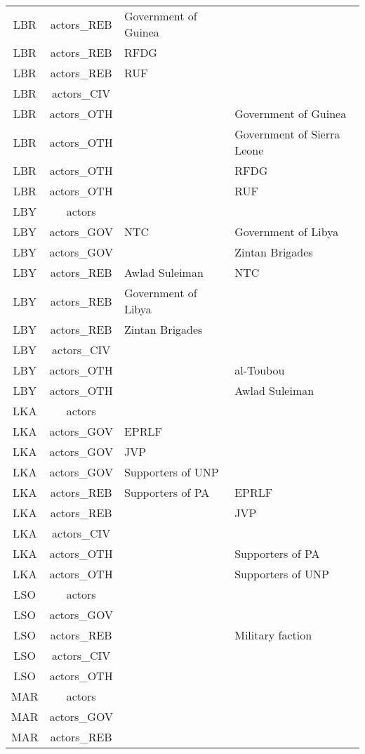 \documentclass[12pt]{article}
\begin{document}
\begin{center}
\begin{longtable}{|c|c|p{7cm}|p{7cm}|}
  LBR & actors\_REB & Government of Guinea &  \\ 
  LBR & actors\_REB & RFDG &  \\ 
  LBR & actors\_REB & RUF &  \\ 
  LBR & actors\_CIV &  &  \\ 
  LBR & actors\_OTH &  & Government of Guinea \\ 
  LBR & actors\_OTH &  & Government of Sierra Leone \\ 
  LBR & actors\_OTH &  & RFDG \\ 
  LBR & actors\_OTH &  & RUF \\ 
  LBY & actors &  &  \\ 
  LBY & actors\_GOV & NTC & Government of Libya \\ 
  LBY & actors\_GOV &  & Zintan Brigades \\ 
  LBY & actors\_REB & Awlad Suleiman & NTC \\ 
  LBY & actors\_REB & Government of Libya &  \\ 
  LBY & actors\_REB & Zintan Brigades &  \\ 
  LBY & actors\_CIV &  &  \\ 
  LBY & actors\_OTH &  & al-Toubou \\ 
  LBY & actors\_OTH &  & Awlad Suleiman \\ 
  LKA & actors &  &  \\ 
  LKA & actors\_GOV & EPRLF &  \\ 
  LKA & actors\_GOV & JVP &  \\ 
  LKA & actors\_GOV & Supporters of UNP &  \\ 
  LKA & actors\_REB & Supporters of PA & EPRLF \\ 
  LKA & actors\_REB &  & JVP \\ 
  LKA & actors\_CIV &  &  \\ 
  LKA & actors\_OTH &  & Supporters of PA \\ 
  LKA & actors\_OTH &  & Supporters of UNP \\ 
  LSO & actors &  &  \\ 
  LSO & actors\_GOV &  &  \\ 
  LSO & actors\_REB &  & Military faction \\ 
  LSO & actors\_CIV &  &  \\ 
  LSO & actors\_OTH &  &  \\ 
  MAR & actors &  &  \\ 
  MAR & actors\_GOV &  &  \\ 
  MAR & actors\_REB &  &  \\ 

\end{longtable}
\end{center}
\end{document}
